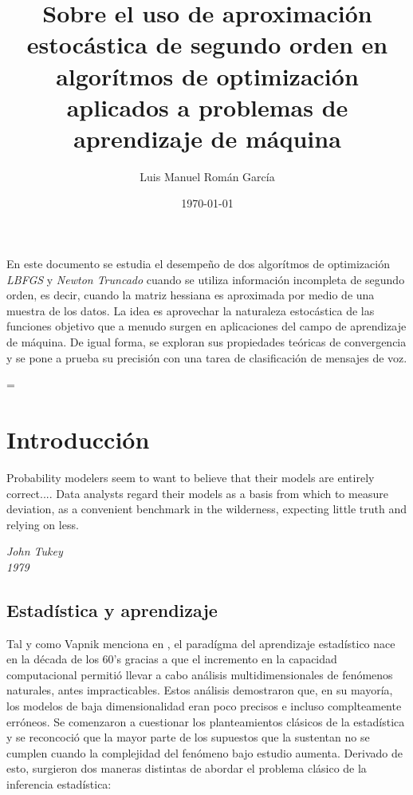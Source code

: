 \documentclass{book}
\title{Sobre el uso de aproximación estocástica de segundo orden en algorítmos de optimización  aplicados a problemas de aprendizaje de máquina}
\author{Luis Manuel Román García}
\date{\today}
\makeatletter
\theoremstyle{plain}
\theoremstyle{definition}
\theoremstyle{remark}
\newenvironment{abstract}{%
      \titlepage
      \null\vfil
      \@beginparpenalty\@lowpenalty
      \begin{center}%
        \bfseries \abstractname
        \@endparpenalty\@M
      \end{center}}%
     {\par\vfil\null\endtitlepage}
\newenvironment{abstract}{%
      \if@twocolumn
        \section*{\abstractname}%
      \else
        \small
        \begin{center}%
          {\bfseries \abstractname\vspace{-.5em}\vspace{\z@}}%
        \end{center}%
        \quotation
      \fi}
      {\if@twocolumn\else\endquotation\fi}
\newenvironment{absolutelynopagebreak}
  {\par\nobreak\vfil\penalty0\vfilneg
   \vtop\bgroup}
  {\par\xdef\tpd{\the\prevdepth}\egroup
   \prevdepth=\tpd}
\makeatother
\begin{document}
\maketitle
\VerbatimFootnotes


\begin{absolutelynopagebreak}
\begin{abstract}
En este documento se estudia el desempeño de dos algorítmos de optimización \emph{LBFGS} y \emph{Newton Truncado} cuando se utiliza información incompleta de segundo orden, es decir, cuando la matriz hessiana es aproximada por medio de una muestra de los datos. La idea es aprovechar la naturaleza estocástica de las funciones objetivo que a menudo surgen en aplicaciones del campo de aprendizaje de máquina. De igual forma, se exploran sus propiedades teóricas de convergencia y se pone a prueba su precisión con una tarea de clasificación de mensajes de voz.
\end{abstract}
\end{absolutelynopagebreak}

\tableofcontents
{}


\chapter{Introducción}


\epigraph{
 Probability modelers seem to want to believe that their models are entirely correct.... Data analysts regard their models as a basis from which to measure deviation, as a convenient benchmark in the wilderness, expecting little truth and relying on less.}{\textit{John Tukey \\ 1979}}

\newpage

\section{Estadística y aprendizaje}

Tal y como Vapnik menciona en \cite{VAPNIK1}, el paradígma del aprendizaje estadístico nace en la década de los 60's gracias a que el incremento en la capacidad computacional permitió llevar a cabo análisis multidimensionales de fenómenos naturales, antes impracticables. Estos análisis demostraron que, en su mayoría, los modelos de baja dimensionalidad eran poco precisos e incluso complteamente erróneos. Se comenzaron a cuestionar los planteamientos clásicos de la estadística y se reconcoció que la mayor parte de los supuestos que la sustentan no se cumplen cuando la complejidad del fenómeno bajo estudio aumenta. Derivado de esto, surgieron dos maneras distintas de abordar el problema clásico de la inferencia estadística:
\end{document}
